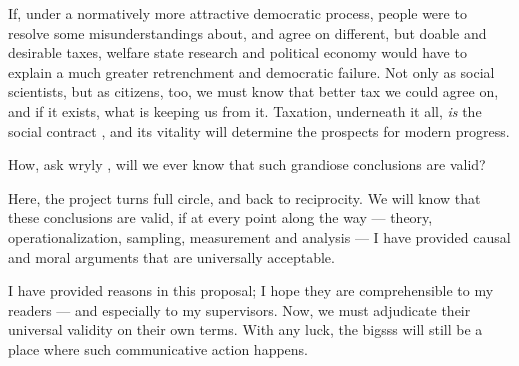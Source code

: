 If, under a normatively more attractive democratic process, people were to resolve some misunderstandings about, and agree on different, but doable and desirable taxes, welfare state research and political economy would have to explain a much greater retrenchment and democratic failure.
Not only as social scientists, but as citizens, too, we must know that better tax we could agree on, and if it exists, what is keeping us from it.
Taxation, underneath it all, \emph{is} the social contract \citep{SchumpeterSwedberg-1942-aa}, and its vitality will determine the prospects for modern progress.

How, ask wryly \citet[2]{PrzeworskiSalomon1995}, will we ever know that such grandiose conclusions are valid?

Here, the project turns full circle, and back to reciprocity.
We will know that these conclusions are valid, if at every point along the way --- theory, operationalization, sampling, measurement and analysis --- I have provided causal and moral arguments that are universally acceptable.

I have provided reasons in this proposal;
I hope they are comprehensible to my readers --- and especially to my supervisors.
Now, we must adjudicate their universal validity on their own terms.
With any luck, the \gls{bigsss} will still be a place where such communicative action happens.

